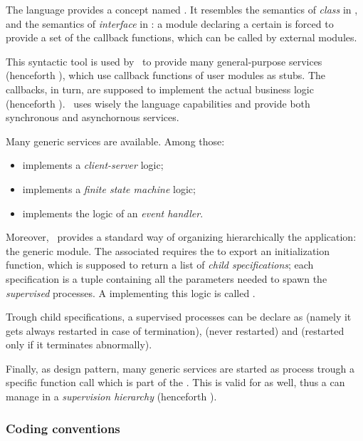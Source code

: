 The language provides a concept named . It resembles the
semantics of \emph{class} in , and the semantics of
\emph{interface} in : a module declaring a certain
 is forced to provide a set of the callback functions,
which can be called by external modules.

This syntactic tool is used by \OTP\ to provide many general-purpose
services (henceforth ), which use callback
functions of user modules as stubs. The callbacks, in turn, are supposed
to implement the actual business logic (henceforth ). \OTP\ uses wisely the language capabilities and
provide both synchronous and asynchornous services.

Many generic services are available. Among those:
\begin{itemize}
\item   {} implements a \emph{client-server} logic;
\item   {} implements a \emph{finite state machine} logic;
\item   {} implements the logic of an
        \emph{event handler}.
\end{itemize}

Moreover, \OTP\ provides a standard way of organizing hierarchically the
application: the generic  module. The associated
 requires the  to export an
initialization function, which is supposed to return a list of
\emph{child specifications}; each specification is a tuple containing all
the parameters needed to spawn the \emph{supervised} processes. A
 implementing this logic is called
.

Trough child specifications, a supervised processes can be declare as
 (namely it gets always restarted in case of
termination),  (never restarted) and
 (restarted only if it terminates abnormally).

Finally, as design pattern, many generic services are started as process
trough a specific function call which is part of the . This is valid for  as well, thus a
 can manage  in a
\emph{supervision hierarchy} (henceforth ).

\subsubsection{Coding conventions} \label{subsub:CodingConventions}

